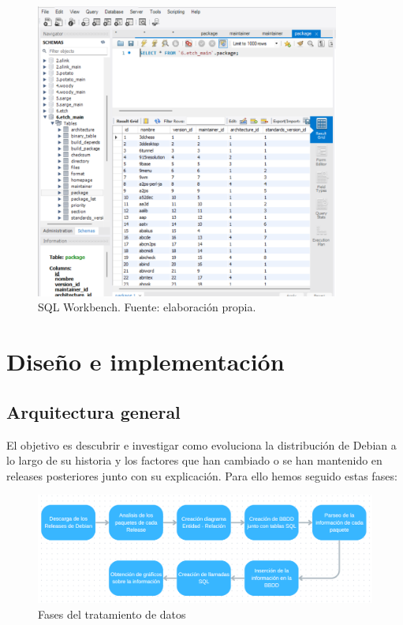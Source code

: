 \documentclass[a4paper, 12pt]{book}
\begin{document}
\begin{figure}[hb]
	\centering
	\includegraphics[width=10cm, keepaspectratio]{img/workbench.png}
	\caption{SQL Workbench. Fuente: elaboración propia.}
	\label{fig:workbench}
\end{figure}

\cleardoublepage
\chapter{Diseño e implementación}
\label{sec:diseno}

\section{Arquitectura general} 
\label{sec:arquitectura}
El objetivo es descubrir e investigar como evoluciona la distribución de Debian a lo largo de su historia y los factores que han cambiado o se han mantenido en releases posteriores junto con su explicación. Para ello hemos seguido estas fases:
\begin{figure}[h]
	\centering
	\includegraphics[width=14cm, keepaspectratio]{img/Diagrama_general.png}
	\caption{Fases del tratamiento de datos}
	\label{fig:Diagrama_general}
\end{figure}
\end{document}
